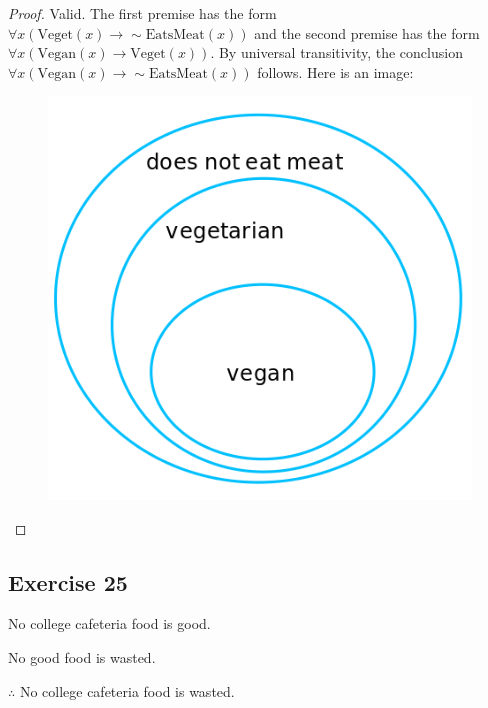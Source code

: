\documentclass[14pt]{extarticle}
\newcommand{\fa}{\forall}
\begin{document}
\begin{proof}
Valid. The first premise has the form $\fa x(\text{Veget}(x) \to \sim\text{EatsMeat}(x))$ and the second premise has the form $\fa x(\text{Vegan}(x) \to \text{Veget}(x))$. By universal transitivity, the conclusion $\fa x (\text{Vegan}(x) \to \sim\text{EatsMeat}(x))$ follows. Here is an image:

\begin{figure}[ht!]
\centering
\includegraphics[scale=0.3]{../images/3.4.24.png}
\end{figure}
\end{proof}

\subsection{Exercise 25}
No college cafeteria food is good.

No good food is wasted.

$\therefore$ No college cafeteria food is wasted.
\end{document}
